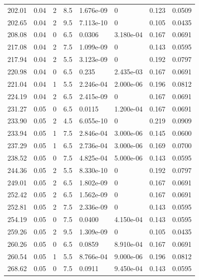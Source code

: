 \documentclass[preview]{standalone}
\begin{document}
{{{\begin{tabular}{L{1.2cm}C{1.2cm} C{0.3cm}C{0.5cm} C{1.4cm}C{1.4cm} C{1.4cm}C{1.4cm}}
  202.01  &  0.04  & 2     & 8.5 &  1.676e-09  & 0  & 0.123 &  0.0509   \\ 
  202.65  &  0.04  & 2     & 9.5 &  7.113e-10  & 0  & 0.105 &  0.0435   \\ 
  208.08  &  0.04  & 0     & 6.5 &  0.0306  & 3.180e-04  & 0.167 &  0.0691   \\ 
  217.08  &  0.04  & 2     & 7.5 &  1.099e-09  & 0  & 0.143 &  0.0595   \\ 
  217.94  &  0.04  & 2     & 5.5 &  3.123e-09  & 0  & 0.192 &  0.0797   \\ 
  220.98  &  0.04  & 0     & 6.5 &  0.235  & 2.435e-03  & 0.167 &  0.0691   \\ 
  221.04  &  0.04  & 1     & 5.5 &  2.246e-04  & 2.000e-06  & 0.196 &  0.0812   \\ 
  224.19  &  0.04  & 2     & 6.5 &  2.415e-09  & 0  & 0.167 &  0.0691   \\ 
  231.27  &  0.05  & 0     & 6.5 &  0.0115  & 1.200e-04  & 0.167 &  0.0691   \\ 
  233.90  &  0.05  & 2     & 4.5 &  6.055e-10  & 0  & 0.219 &  0.0909   \\ 
  233.94  &  0.05  & 1     & 7.5 &  2.846e-04  & 3.000e-06  & 0.145 &  0.0600   \\ 
  237.29  &  0.05  & 1     & 6.5 &  2.736e-04  & 3.000e-06  & 0.169 &  0.0700   \\ 
  238.52  &  0.05  & 0     & 7.5 &  4.825e-04  & 5.000e-06  & 0.143 &  0.0595   \\ 
  244.36  &  0.05  & 2     & 5.5 &  8.330e-10  & 0  & 0.192 &  0.0797   \\ 
  249.01  &  0.05  & 2     & 6.5 &  1.802e-09  & 0  & 0.167 &  0.0691   \\ 
  252.42  &  0.05  & 2     & 6.5 &  1.562e-09  & 0  & 0.167 &  0.0691   \\ 
  252.81  &  0.05  & 2     & 7.5 &  2.336e-09  & 0  & 0.143 &  0.0595   \\ 
  254.19  &  0.05  & 0     & 7.5 &  0.0400  & 4.150e-04  & 0.143 &  0.0595   \\ 
  259.26  &  0.05  & 2     & 9.5 &  1.309e-09  & 0  & 0.105 &  0.0435   \\ 
  260.26  &  0.05  & 0     & 6.5 &  0.0859  & 8.910e-04  & 0.167 &  0.0691   \\ 
  260.54  &  0.05  & 1     & 5.5 &  8.766e-04  & 9.000e-06  & 0.196 &  0.0812   \\ 
  268.62  &  0.05  & 0     & 7.5 &  0.0911  & 9.450e-04  & 0.143 &  0.0595   \\ 

\end{tabular}}}}
\end{document}
